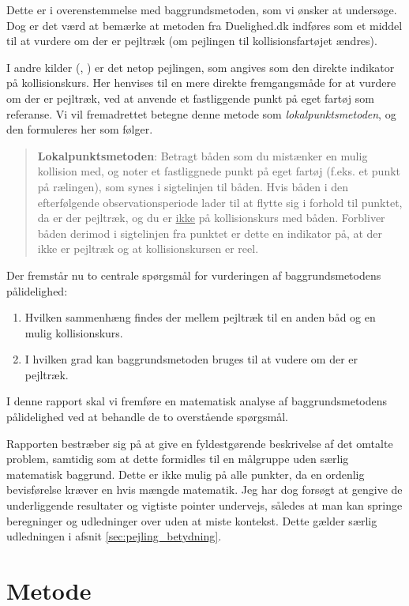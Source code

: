 \documentclass[%
 reprint,
nofootinbib,
aps,
]{revtex4-1}
\begin{document}
Dette er i overenstemmelse med baggrundsmetoden, som vi ønsker at undersøge. Dog er det værd at bemærke at metoden fra Duelighed.dk indføres som et middel til at vurdere om der er pejltræk (om pejlingen til kollisionsfartøjet ændres). \par
I andre kilder (\cite{studienoter}, \cite{retsinformation} \cite{groensund}) er det netop pejlingen, som angives som den direkte indikator på kollisionskurs. Her henvises til en mere direkte fremgangsmåde for at vurdere om der er pejltræk, ved at anvende et fastliggende punkt på eget fartøj som referanse.  Vi vil fremadrettet betegne denne metode som \textit{lokalpunktsmetoden}, og den formuleres her som følger.
\begin{quote}
\textbf{Lokalpunktsmetoden}: Betragt båden som du mistænker en mulig kollision med, og noter et fastliggnede punkt på eget fartøj (f.eks. et punkt på rælingen), som synes i sigtelinjen til båden. Hvis båden i den efterfølgende observationsperiode lader til at flytte sig i forhold til punktet, da er der pejltræk, og du er \underline{ikke} på kollisionskurs med båden. Forbliver båden derimod i sigtelinjen fra punktet er dette en indikator på, at der ikke er pejltræk og at kollisionskursen er reel.
\end{quote}
Der fremstår nu to centrale spørgsmål for vurderingen af baggrundsmetodens pålidelighed:
\begin{enumerate}
  \item Hvilken sammenhæng findes der mellem pejltræk til en anden båd og en mulig kollisionskurs.
  \item I hvilken grad kan baggrundsmetoden bruges til at vudere om der er pejltræk.
\end{enumerate}
I denne rapport skal vi fremføre en matematisk analyse af baggrundsmetodens pålidelighed ved at behandle de to overstående spørgsmål. \par
Rapporten bestræber sig på at give en fyldestgørende beskrivelse af det omtalte problem, samtidig som at dette formidles til en målgruppe uden særlig matematisk baggrund. Dette er ikke mulig på alle punkter, da en ordenlig bevisførelse kræver en hvis mængde matematik. Jeg har dog forsøgt at gengive de underliggende resultater og vigtiste pointer undervejs, således at man kan springe beregninger og udledninger over uden at miste kontekst. Dette gælder særlig udledningen i afsnit \ref{sec:pejling_betydning}.


\section{Metode}
\end{document}
